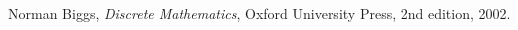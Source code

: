 \begin{questions}
\begin{solution}
\end{solution}

\end{questions}

\begin{thebibliography}{9}

  Norman Biggs,
  \emph{Discrete Mathematics},
  Oxford University Press,
  2nd edition,
  2002.
\end{thebibliography}
